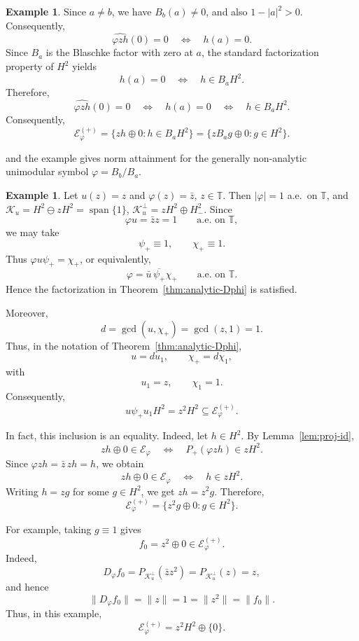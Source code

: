 \documentclass[12pt]{amsart}
\theoremstyle{definition}
\newtheorem{example}[theorem]{Example}
\theoremstyle{remark}
\def \T{\mathbb{T}}
\newcommand{\cle}{\mathcal{E}}
\newcommand{\clk}{\mathcal{K}}
\newcommand{\vp}{\varphi}
\numberwithin{equation}{section}
\begin{document}
\begin{example}
Since $a\neq b$, we have $B_b(a)\neq0$, and also $1-|a|^2>0$.
Consequently,
\[
\widehat{\vp zh}(0)=0
\quad\Longleftrightarrow\quad
h(a)=0.
\]
Since $B_a$ is the Blaschke factor with zero at $a$, the standard
factorization property of $H^2$ yields
\[
h(a)=0
\quad\Longleftrightarrow\quad
h\in B_aH^2.
\]
Therefore,
\[
\widehat{\vp zh}(0)=0
\quad\Longleftrightarrow\quad
h(a)=0
\quad\Longleftrightarrow\quad
h\in B_aH^2.
\]
Consequently,
\[
\cle_\vp^{(+)}=\{zh\oplus0:h\in B_aH^2\}=\{zB_a g\oplus0:g\in H^2\}.
\]

and the example gives norm attainment for the generally non-analytic
unimodular symbol $\vp=B_b/B_a$.
\end{example}



\begin{example}\label{ex:trivial}
Let $u(z)=z$ and $\vp(z)=\bar{z}$, $z\in \T$. Then $|\vp|=1$ a.e.\ on $\T$, and $\clk_u=H^2\ominus zH^2=\operatorname{span}\{1\}$, $\clk_u^\perp=zH^2\oplus H^2_{-}$. Since
\[
\vp{u}=\bar{z} z=1 \qquad\text{a.e. on }\T,
\]
we may take
\[
\psi_{+}\equiv1,\qquad\chi_{+}\equiv1.
\]
Thus $\vp u\psi_{+}=\chi_{+}$, or equivalently,
\[
\vp=\bar{u}\,\overline{\psi_{+}}\chi_{+}\qquad\text{a.e. on }\T.
	\]
Hence the factorization in Theorem~\ref{thm:analytic-Dphi} is satisfied.
	
Moreover,
\[
d=\gcd(u,\chi_{+})=\gcd(z,1)=1.
\]
Thus, in the notation of Theorem~\ref{thm:analytic-Dphi},
\[
u=du_1,\qquad\chi_{+}=d\chi_1,
\]
with
\[
u_1=z,\qquad\chi_1=1.
\]
Consequently,
\[
u\psi_{+}u_1H^2=z^2H^2\subseteq\cle_\vp^{(+)}.
\]
	
In fact, this inclusion is an equality. Indeed, let $h\in H^2$.
By Lemma~\ref{lem:proj-id},
\[
zh\oplus0\in\cle_\vp \quad\Longleftrightarrow\quad
P_{+}(\vp zh)\in zH^2.
\]
Since $\vp zh=\bar{z}\,zh=h$, we obtain
\[
zh\oplus0\in\cle_\vp\quad\Longleftrightarrow\quad
h\in zH^2.
\]
Writing $h=zg$ for some $g\in H^2$, we get $zh=z^2g$. Therefore,
\[
\cle_\vp^{(+)}=\{z^2g\oplus0:g\in H^2\}.
\]
	
For example, taking $g\equiv1$ gives
\[
f_0=z^2\oplus0\in\cle_\vp^{(+)}.
\]
Indeed,
\[
D_\vp f_0=P_{\clk_u^\perp}(\bar{z} z^2)=P_{\clk_u^\perp}(z)
=z,
\]
and hence
\[
\|D_\vp f_0\|=\|z\|=1=\|z^2\|=\|f_0\|.
\]
Thus, in this example,
\[
\cle_\vp^{(+)} =z^2H^2\oplus\{0\}.
\]
\end{example}
\end{document}
